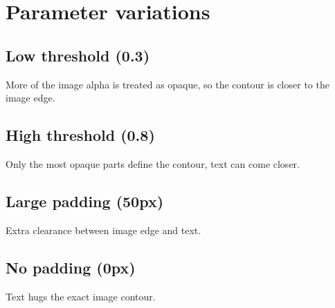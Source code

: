 \documentclass{article}
\begin{document}
\section*{Parameter variations}

\subsection*{Low threshold (0.3)}
More of the image alpha is treated as opaque,
so the contour is closer to the image edge.

\lipsum[1-2]

\newpage

\subsection*{High threshold (0.8)}
Only the most opaque parts define the contour,
text can come closer.

\lipsum[1-2]

\newpage

\subsection*{Large padding (50px)}
Extra clearance between image edge and text.

\lipsum[1-2]

\newpage

\subsection*{No padding (0px)}
Text hugs the exact image contour.

\lipsum[1-3]
\end{document}
